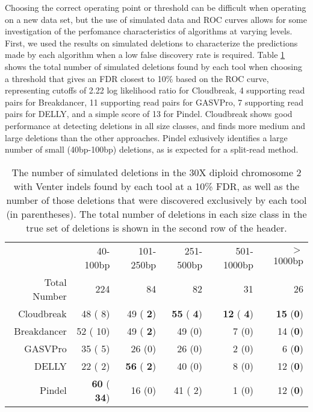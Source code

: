 \documentclass[11pt]{article}
\begin{document}
Choosing the correct operating point or threshold can be difficult when operating on a new data set, but the use of simulated data and ROC curves allows for some investigation of the perfomance characteristics of algorithms at varying levels. First, we used the results on simulated deletions to characterize the predictions made by each algorithm when a low false discovery rate is required. Table \ref{chr2DeletionPredsFDR10} shows the total number of simulated deletions found by each tool when choosing a threshold that gives an FDR closest to 10\% based on the ROC curve, representing cutoffs of 2.22 log likelihood ratio for Cloudbreak, 4 supporting read pairs for Breakdancer, 11 supporting read pairs for GASVPro, 7 supporting read pairs for DELLY, and a simple score of 13 for Pindel. Cloudbreak shows good performance at detecting deletions in all size classes, and finds more medium and large deletions than the other approaches. Pindel exlusively identifies a large number of small (40bp-100bp) deletions, as is expected for a split-read method.

\begin{table}[b]
\begin{center}
\begin{tabular}{rrrrrr}
  \hline
 & 40-100bp  & 101-250bp  & 251-500bp & 501-1000bp & $>$ 1000bp \\ 
 Total Number & 224 &  84 & 82 &  31 & 26\\ 
  \hline
  Cloudbreak  &   48 (   8)  &   49 (\textbf{   2}) &  \textbf{  55} (\textbf{   4}) & \textbf{  12} (\textbf{   4}) & \textbf{  15} (\textbf{0}) \\ 
  Breakdancer &   52 (  10)  &   49 (\textbf{   2}) &    49 (0) &    7 (0) &   14 (\textbf{0}) \\ 
  GASVPro     &   35 (   5)  &   26 (0) &    26 (0) &    2 (0) &    6 (\textbf{0}) \\ 
  DELLY       &   22 (   2)  & \textbf{  56} (\textbf{   2}) &    40 (0) &    8 (0) &   12 (\textbf{0}) \\ 
  Pindel      & \textbf{  60} (\textbf{  34})  &   16 (0) &    41 (   2) &    1 (0) &   12 (\textbf{0})\\ 
   \hline
\end{tabular}
\end{center}
\caption{The number of simulated deletions in the 30X diploid chromosome 2 with Venter indels found by each tool at a 10\% FDR, as well as the number of those deletions that were discovered exclusively by each tool (in parentheses). The total number of deletions in each size class in the true set of deletions is shown in the second row of the header.}
\label{chr2DeletionPredsFDR10}
\end{table}
\end{document}

